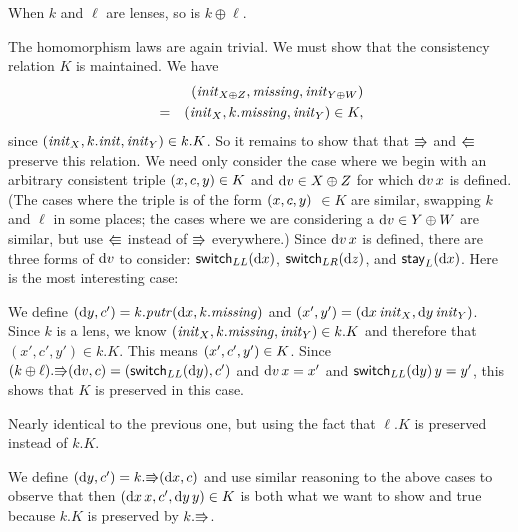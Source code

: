 
\begin{theorem}
    When $k$ and $\ell$ are lenses, so is $k \oplus \ell$.
    \label{goodlens:tensor_sum}
\end{theorem}
\begin{pf}
The homomorphism laws are again trivial.  
We must show that the consistency relation $K$ is maintained. We have
\begin{eqnarray*}
&& (\mathit{init}_{X \oplus Z},\mathit{missing},\mathit{init}_{Y \oplus
W}) \\ & = & ({\mathit{init}_X},{k.\mathit{missing}},{\mathit{init}_Y}) \in K,
\end{eqnarray*}
since
$(\mathit{init}_X,k.\mathit{init},\mathit{init}_Y) \in k.K$.  So it remains to show that that
$\mathord{\Rrightarrow}$ and $\mathord{\Lleftarrow}$ preserve this relation. We need only consider 
the case where we begin with an arbitrary consistent triple
$( x, c, y) \in K$ and $\textrm{d} v \in X \oplus Z$ for which
$\textrm{d} v\, x$ is defined. (The cases where the triple is of the form
$( x, c, y)$ $ \in K$ are similar, swapping $k$ and
$\ell$ in some places; the cases where we are considering a $\textrm{d} v \in Y
\oplus W$ are similar, but use $\mathord{\Lleftarrow}$ instead of $\mathord{\Rrightarrow}$ everywhere.)
Since $\textrm{d} v\, x$ is defined, there are three forms of $\textrm{d} v$ to consider:
$\mathsf{switch}_{LL}(\textrm{d} x)$, $\mathsf{switch}_{LR}(\textrm{d} z)$, and $\mathsf{stay}_L(\textrm{d} x)$. \iffull\else Here is the
most interesting case:\fi
\begin{trivlist} 
\nextcase{$\dv=\mlswitchll\dx$} We define $(\textrm{d} y,c') =
    k.\mathit{putr}(\textrm{d} x,k.\mathit{missing})$ and $(x',y')=(\textrm{d} x\,\mathit{init}_X,\textrm{d} y\,\mathit{init}_Y)$.
    Since $k$ is a lens, we know $(\mathit{init}_X,k.\mathit{missing},\mathit{init}_Y) \in k.K$ and
    therefore that $(x',c',y') \in k.K$. This means
    $({x'},{c'},{y'}) \in K$. Since
    $(k\oplus\ell).\mathord{\Rrightarrow}(\textrm{d} v, c)=(\mathsf{switch}_{LL}(\textrm{d} y),{c'})$ and
    $\textrm{d} v\, x = {x'}$ and $\mathsf{switch}_{LL}(\textrm{d} y)\, y =
    {y'}$, this shows that $K$ is preserved in this case.
\iffull

\nextcase{$\dv=\mlswitchlr\dz$} Nearly identical to the previous one, but
    using the fact that $\ell.K$ is preserved instead of $k.K$.

\nextcase{$\dv=\mlstayl\dx$} We define $(\textrm{d} y,c') = k.\mathord{\Rrightarrow}(\textrm{d} x,c)$ and use
    similar reasoning to the above cases to observe that then
    $({\textrm{d} x\,x},{c'},{\textrm{d} y\,y}) \in K$ is both what we want
    to show and true because $k.K$ is preserved by $k.\mathord{\Rrightarrow}$.
\fi
    \endofpf
\end{trivlist}
\end{pf}

